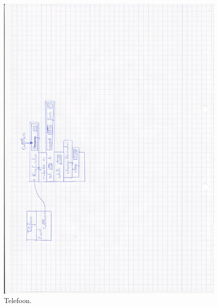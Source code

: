 \documentclass[]{article}
\begin{document}
 \begin{figure}
  \centering
\includegraphics[scale=0.15]{mockups/telefoon.jpg}
  \caption{Telefoon.} \label{telefoon}
\end{figure} 
\end{document}
